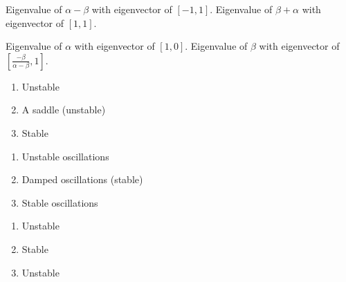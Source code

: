 \documentclass[]{memoir}
\begin{document}
Eigenvalue of $\alpha-\beta$ with eigenvector of $[-1,1]$. Eigenvalue of
$\beta+\alpha$ with eigenvector of $[1,1]$.


Eigenvalue of $\alpha$ with eigenvector of $[1,0]$. Eigenvalue of
$\beta$ with eigenvector of
$\left[\frac{-\beta}{\alpha-\beta},1 \right]$.


\begin{enumerate}
\def\labelenumi{\arabic{enumi}.}
\itemsep1pt\parskip0pt
\item
  Unstable
\item
  A saddle (unstable)
\item
  Stable
\end{enumerate}


\begin{enumerate}
\def\labelenumi{\arabic{enumi}.}
\itemsep1pt\parskip0pt
\item
  Unstable oscillations
\item
  Damped oscillations (stable)
\item
  Stable oscillations
\end{enumerate}


\begin{enumerate}
\def\labelenumi{\arabic{enumi}.}
\itemsep1pt\parskip0pt
\item
  Unstable
\item
  Stable
\item
  Unstable
\end{enumerate}
\end{document}
